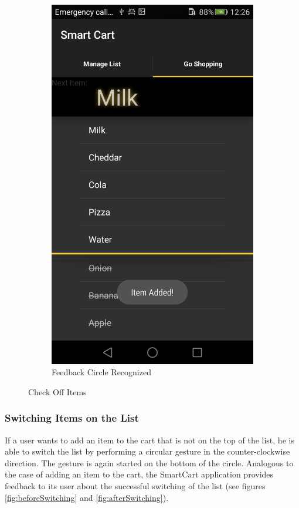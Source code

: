\begin{figure}[h]
\begin{subfigure}{0.475\textwidth}
\centering 
\includegraphics[height= 0.3\textheight]{res/usermanual/circleRecognized.png}
\caption{Feedback Circle Recognized}
\label{fig:feedbackCircle}
\end{subfigure}
\caption{Check Off Items}
\label{fig:checkItems}
\end{figure}

\subsubsection{Switching Items on the List}
If a user wants to add an item to the cart that is not on the top of the list,
he is able to switch the list by performing a circular gesture in the
counter-clockwise direction. The gesture is again started on the bottom of the
circle. Analogous to the case of adding an item to the cart, the SmartCart
application provides feedback to its user about the successful switching of the
list (see figures \ref{fig:beforeSwitching} and \ref{fig:afterSwitching}).

